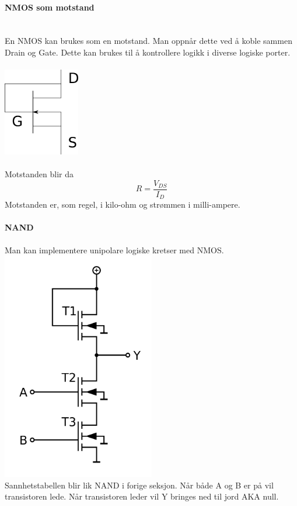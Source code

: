 \paragraph{NMOS som motstand} \mbox{} \\
En NMOS kan brukes som en motstand.
Man oppnår dette ved å koble sammen Drain og Gate.
Dette kan brukes til å kontrollere logikk i diverse logiske porter.
\\\\
\includegraphics[width=0.25\textwidth]{./img/nmos-resistor}
\\\\
Motstanden blir da
$$R = \frac{V_{DS}}{I_D}$$
Motstanden er, som regel, i kilo-ohm og strømmen i milli-ampere.



\paragraph{NAND} \mbox \\
Man kan implementere unipolare logiske kretser med NMOS.
\\
\includegraphics[width=0.5\textwidth]{./img/nmos-nand}
\\
Sannhetstabellen blir lik NAND i forige seksjon.
Når både A og B er på vil transistoren lede.
Når transistoren leder vil Y bringes ned til jord AKA null.



